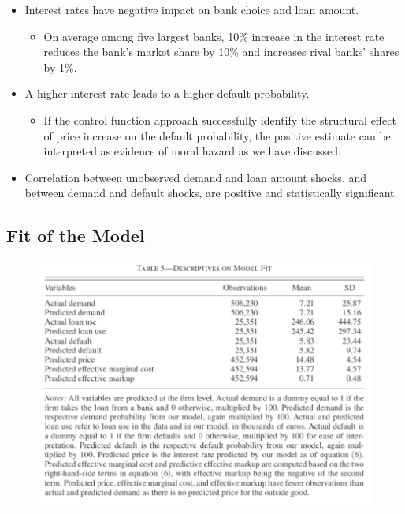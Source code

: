 \documentclass[]{book}
\providecommand{\tightlist}{%
  \setlength{\itemsep}{0pt}\setlength{\parskip}{0pt}}
\begin{document}
\begin{itemize}
\tightlist
\item
  Interest rates have negative impact on bank choice and loan amount.

  \begin{itemize}
  \tightlist
  \item
    On average among five largest banks, 10\% increase in the interest
    rate reduces the bank's market share by 10\% and increases rival
    banks' shares by 1\%.
  \end{itemize}
\item
  A higher interest rate leads to a higher default probability.

  \begin{itemize}
  \tightlist
  \item
    If the control function approach successfully identify the
    structural effect of price increase on the default probability, the
    positive estimate can be interpreted as evidence of moral hazard as
    we have discussed.
  \end{itemize}
\item
  Correlation between unobserved demand and loan amount shocks, and
  between demand and default shocks, are positive and statistically
  significant.
\end{itemize}

\subsection{Fit of the Model}\label{fit-of-the-model}

\begin{figure}
\centering
\includegraphics{figuretable/Crawford_2018_Table5.png}
\caption{}
\end{figure}
\end{document}
